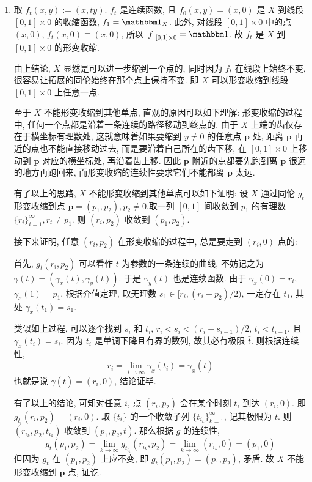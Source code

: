 \subsection{} %
\begin{enumerate}[label=(\alph*)]
    \item 取 $f_t(x, y) := (x, ty)$. $f_t$ 是连续函数, 且 $f_0(x, y) = (x, 0)$ 是 $X$ 到线段 $[0, 1] \times {0}$ 的收缩函数, $f_1 = \id{X}$. 此外, 对线段 $[0, 1] \times {0}$ 中的点 $(x, 0)$, $f_t(x, 0) \equiv (x, 0)$, 所以 $\left.f\right|_{[0, 1] \times {0}} = \idnon$. 故 $f_t$ 是 $X$ 到 $[0, 1] \times {0}$ 的形变收缩.

    由上结论, $X$ 显然是可以进一步缩到一个点的, 同时因为 $f_t$ 在线段上始终不变, 很容易让拓展的同伦始终在那个点上保持不变. 即 $X$ 可以形变收缩到线段 $[0, 1] \times {0}$ 上任意一点.
    
    至于 $X$ 不能形变收缩到其他单点, 直观的原因可以如下理解: 形变收缩的过程中, 任何一个点都是沿着一条连续的路径移动到终点的. 由于 $X$ 上端的齿仅存在于横坐标有理数处, 这就意味着如果要缩到 $y \not= 0$ 的任意点 $\mathbf{p}$ 处, 距离 $\mathbf{p}$ 再近的点也不能直接移动过去, 而是要沿着自己所在的齿下移, 在 $[0, 1] \times {0}$ 上移动到 $\mathbf{p}$ 对应的横坐标处, 再沿着齿上移. 因此 $\mathbf{p}$ 附近的点都要先跑到离 $\mathbf{p}$ 很远的地方再跑回来, 而形变收缩的连续性要求它们不能都离 $\mathbf{p}$ 太远.

    有了以上的思路, $X$ 不能形变收缩到其他单点可以如下证明: 设 $X$ 通过同伦 $g_t$ 形变收缩到点 $\mathbf{p} = (p_1, p_2), p_2 \not= 0$.取一列 $[0, 1]$ 间收敛到 $p_1$ 的有理数 $\{r_i\}_{i = 1}^{\infty}, r_t \not= p_1$. 则 $(r_i, p_2)$ 收敛到 $(p_1, p_2)$. 

    接下来证明, 任意 $(r_i, p_2)$ 在形变收缩的过程中, 总是要走到 $(r_i, 0)$ 点的:
    \begin{proofquote}
        首先, $g_t(r_i, p_2)$ 可以看作 $t$ 为参数的一条连续的曲线, 不妨记之为 $\gamma(t) = (\gamma_x(t), \gamma_y(t))$. 于是 $\gamma_y(t)$ 也是连续函数. 由于 $\gamma_x(0) = r_i$, $\gamma_x(1) = p_1$, 根据介值定理, 取无理数 $s_1 \in [r_i, (r_i + p_2) / 2)$, 一定存在 $t_1$, 其处 $\gamma_x(t_1) = s_1$. 

        类似如上过程, 可以逐个找到 $s_i$ 和 $t_i$, $r_i < s_i < (r_i + s_{i - 1}) / 2$, $t_i < t_{i - 1}$, 且 $\gamma_x(t_i) = s_i$. 因为 $t_i$ 是单调下降且有界的数列, 故其必有极限 $\bar{t}$. 则根据连续性,
        $$
        r_i = \lim_{i \rightarrow \infty}\gamma_x(t_i) = \gamma_x(\bar{t})
        $$
        也就是说 $\gamma(\bar{t}) = (r_i, 0)$, 结论证毕.
    \end{proofquote}
    有了以上的结论, 可知对任意 $i$, 点 $(r_i, p_2)$ 会在某个时刻 $t_i$ 到达 $(r_i, 0)$. 即 $g_{t_i}(r_i, p_2) = (r_i, 0)$. 取 $\{t_i\}$ 的一个收敛子列 $\{t_{i_k}\}_{k = 1}^{\infty}$, 记其极限为 $t$. 则 $(r_{i_k}, p_2, t_{i_k})$ 收敛到 $(p_1, p_2, t)$. 那么根据 $g$ 的连续性, 
    $$
    g_t(p_1, p_2) = \lim_{k \rightarrow \infty} g_{t_{i_k}}(r_{i_k}, p_2) = \lim_{k \rightarrow \infty}(r_{i_k}, 0) = (p_1, 0)
    $$
    但因为 $g_t$ 在 $(p_1, p_2)$ 上应不变, 即 $g_t(p_1, p_2) = (p_1, p_2)$, 矛盾. 故 $X$ 不能形变收缩到 $\mathbf{p}$ 点, 证讫.
\end{enumerate} 